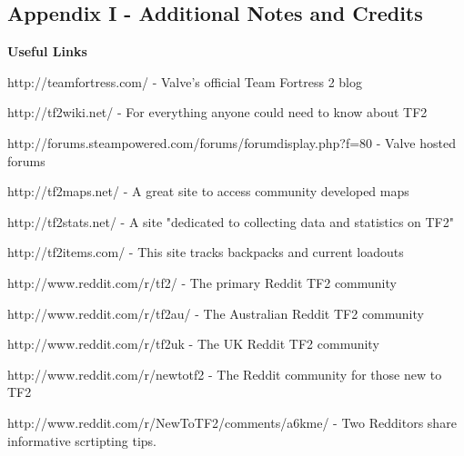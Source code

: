 \subsection{Appendix I - Additional Notes and Credits}
\newenvironment{packed_item}{
\begin{itemize}
  \setlength{\itemsep}{1pt}
  \setlength{\parskip}{0pt}
  \setlength{\parsep}{0pt}
}{\end{itemize}}

{\bf Useful Links}

http://teamfortress.com/ - Valve's official Team Fortress 2 blog

http://tf2wiki.net/ - For everything anyone could need to know about TF2

http://forums.steampowered.com/forums/forumdisplay.php?f=80 - Valve hosted forums 

http://tf2maps.net/ - A great site to access community developed maps

http://tf2stats.net/ - A site "dedicated to collecting data and statistics on TF2"

http://tf2items.com/ - This site tracks backpacks and current loadouts

http://www.reddit.com/r/tf2/ - The primary Reddit TF2 community

http://www.reddit.com/r/tf2au/ - The Australian Reddit TF2 community

http://www.reddit.com/r/tf2uk - The UK Reddit TF2 community

http://www.reddit.com/r/newtotf2 - The Reddit community for those new to TF2

http://www.reddit.com/r/NewToTF2/comments/a6kme/ - Two Redditors share informative scrtipting tips.


